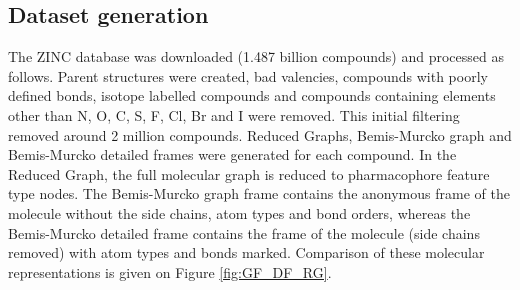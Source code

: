 \documentclass[doublespacing]{bmcart}
\begin{document}
\subsection*{Dataset generation}

The ZINC database was downloaded (1.487 billion compounds)\cite{ZINC15} and processed as follows. Parent structures were created, bad valencies, compounds with poorly defined bonds, isotope labelled compounds and compounds containing elements other than N, O, C, S, F, Cl, Br and I were removed. This initial filtering removed around 2 million compounds. Reduced Graphs\cite{RedGraph2003,RedGraph2004}, Bemis-Murcko graph and Bemis-Murcko detailed frames\cite{BemisMurcko} were generated for each compound. In the Reduced Graph, the full molecular graph is reduced to pharmacophore feature type nodes. The Bemis-Murcko graph frame contains the anonymous frame of the molecule without the side chains, atom types and bond orders, whereas the Bemis-Murcko detailed frame contains the frame of the molecule (side chains removed) with atom types and bonds marked. Comparison of these molecular representations is given on Figure \ref{fig:GF_DF_RG}.
\end{document}
